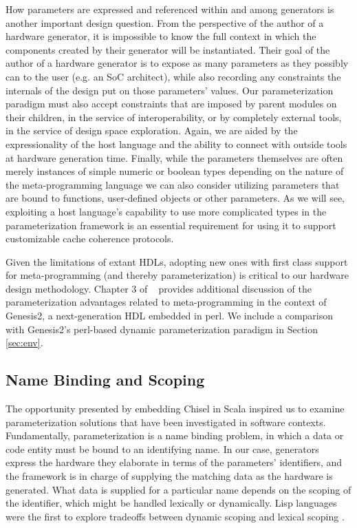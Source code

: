 How parameters are expressed and referenced within and among generators is another important design question.
From the perspective of the author of a hardware generator, it is impossible to know the full context in which the components created by their generator will be instantiated.
Their goal of the author of a hardware generator is to expose as many parameters as they possibly can to the user (e.g. an SoC architect),
while also recording any constraints the internals of the design put on those parameters' values.
Our parameterization paradigm must also accept constraints that are imposed by parent modules on their children, in the service of interoperability,
or by completely external tools, in the service of design space exploration.
Again, we are aided by the expressionality of the host language and the ability to connect with outside tools at hardware generation time.
Finally, while the parameters themselves are often merely instances of simple numeric or boolean types
depending on the nature of the meta-programming language we can also consider utilizing parameters that are bound to functions, user-defined objects
or other parameters.
As we will see, exploiting a host language's capability to use more complicated types in the parameterization framework
is an essential requirement for using it to support customizable cache coherence protocols.

Given the limitations of extant HDLs, adopting new ones with first class support for meta-programming (and thereby parameterization)
is critical to our hardware design methodology.
Chapter 3 of ~\cite{shacham2011chip} provides additional discussion of the 
parameterization advantages related to meta-programming
in the context of Genesis2, a next-generation HDL embedded in perl.
We include a comparison with Genesis2's perl-based dynamic parameterization paradigm in Section \ref{sec:env}.

\subsection{Name Binding and Scoping}

The opportunity presented by embedding Chisel in Scala inspired us to examine parameterization solutions that have been investigated in software contexts.
Fundamentally, parameterization is a name binding problem, in which a data or code entity must be bound to an identifying name.
In our case, generators express the hardware they elaborate in terms of the parameters' identifiers, and the framework is in charge of supplying the matching data
as the hardware is generated.
What data is supplied for a particular name depends on the scoping of the identifier, which might be handled lexically or dynamically.
Lisp languages were the first to explore tradeoffs between dynamic scoping and lexical scoping \cite{gordon}.

